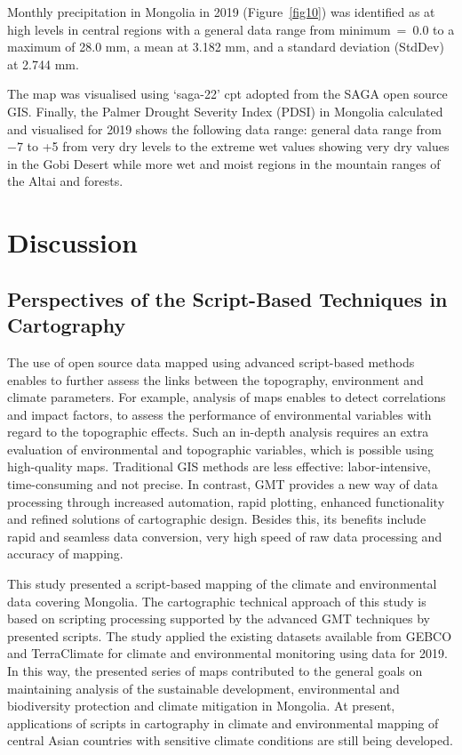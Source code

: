 \documentclass[geosciences,article,accept,pdftex,oneauthor]{Definitions/mdpi}
\begin{document}
Monthly precipitation in Mongolia in 2019 (Figure~\ref{fig10}) was identified as at high levels in central regions with a general data range from minimum~=~0.0 to a maximum of 28.0 mm, a mean at 3.182 mm, and a standard deviation (StdDev) at 2.744 mm. 

The map was visualised using ‘saga-22’ cpt adopted from the SAGA open source GIS. Finally, the Palmer Drought Severity Index (PDSI) in Mongolia calculated and visualised for 2019 shows the following data range: general data range from $-$7 to +5 from very dry levels to the extreme wet values showing very dry values in the Gobi Desert while more wet and moist regions in the mountain ranges of the Altai and forests. 

\section{Discussion}
\subsection{Perspectives of the Script-Based Techniques in Cartography}

The use of open source data mapped using advanced script-based methods enables to further assess the links between the topography, environment and climate parameters. For example, analysis of maps enables to detect correlations and impact factors, to assess the performance of environmental variables with regard to the topographic effects. Such an in-depth analysis requires an extra evaluation of environmental and topographic variables, which is possible using high-quality maps. Traditional GIS methods are less effective: labor-intensive, time-consuming and not precise. In contrast, GMT provides a new way of data processing through increased automation, rapid plotting, enhanced functionality and refined solutions of cartographic design. Besides this, its benefits include rapid and seamless data conversion, very high speed of raw data processing and accuracy of mapping. 

This study presented a script-based mapping of the climate and environmental data covering Mongolia. The cartographic technical approach of this study is based on scripting processing supported by the advanced GMT techniques by presented scripts. The study applied the existing datasets available from GEBCO and TerraClimate for climate and environmental monitoring using data for 2019. In this way, the presented series of maps contributed to the general goals on maintaining analysis of the sustainable development, environmental and biodiversity protection and climate mitigation in Mongolia. At present, applications of scripts in cartography in climate and environmental mapping of central Asian countries with sensitive climate conditions are still being developed. 
\end{document}
